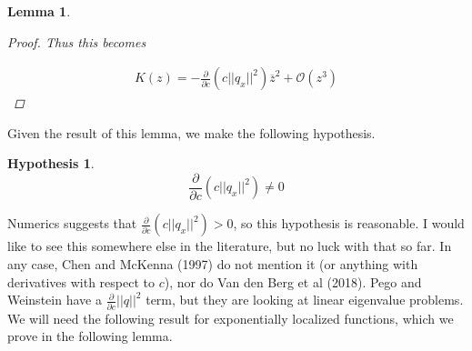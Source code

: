 \documentclass[12pt]{article}
\newtheorem{lemma}{Lemma}
\newtheorem{hypothesis}{Hypothesis}
\begin{document}
\begin{lemma}
\begin{proof}
Thus this becomes 

\begin{align*}
K(z) = -\frac{\partial}{\partial c} \left( c||q_x||^2 \right) \overline{z}^2 + \mathcal{O}(z^3)
\end{align*}

\end{proof}
\end{lemma}

Given the result of this lemma, we make the following hypothesis.

\begin{hypothesis}
\begin{equation}\label{hypnonzero}
\frac{\partial}{\partial c} \left( c||q_x||^2 \right) \neq 0
\end{equation}
\end{hypothesis}

Numerics suggests that $\frac{\partial}{\partial c} \left( c||q_x||^2 \right) > 0$, so this hypothesis is reasonable. I would like to see this somewhere else in the literature, but no luck with that so far. In any case, Chen and McKenna (1997) do not mention it (or anything with derivatives with respect to $c$), nor do Van den Berg et al (2018). Pego and Weinstein have a $\frac{\partial}{\partial c} ||q||^2$ term, but they are looking at linear eigenvalue problems.\\

We will need the following result for exponentially localized functions, which we prove in the following lemma.
\end{document}

